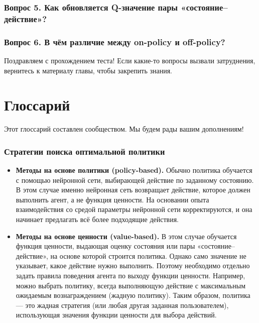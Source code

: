 \documentclass[11pt,a4paper]{article}
\begin{document}
\subsubsection{Вопрос 5. Как обновляется Q-значение пары «состояние--действие»?}\label{q5-how-do-we-update-the-q-value-of-a-state-action-pair-1}


\subsubsection{Вопрос 6. В чём различие между on-policy и off-policy?}\label{q6-whats-the-difference-between-on-policy-and-off-policy-1}


Поздравляем с прохождением теста! Если какие-то вопросы вызвали затруднения, вернитесь к материалу главы, чтобы закрепить знания.

\section{Глоссарий}\label{glossary}

Этот глоссарий составлен сообществом. Мы будем рады вашим дополнениям!

\subsubsection{Стратегии поиска оптимальной политики}\label{strategies-to-find-the-optimal-policy}

\begin{itemize}
\tightlist
\item
  \textbf{Методы на основе политики (policy-based).} Обычно политика обучается с помощью нейронной сети, выбирающей действие по заданному состоянию. В этом случае именно нейронная сеть возвращает действие, которое должен выполнить агент, а не функция ценности. На основании опыта взаимодействия со средой параметры нейронной сети корректируются, и она начинает предлагать всё более подходящие действия.
\item
  \textbf{Методы на основе ценности (value-based).} В этом случае обучается функция ценности, выдающая оценку состояния или пары «состояние--действие», на основе которой строится политика. Однако само значение не указывает, какое действие нужно выполнить. Поэтому необходимо отдельно задать правила поведения агента по выходу функции ценности. Например, можно выбрать политику, всегда выполняющую действие с максимальным ожидаемым вознаграждением (жадную политику). Таким образом, политика --- это жадная стратегия (или любая другая заданная пользователем), использующая значения функции ценности для выбора действий.
\end{itemize}
\end{document}
